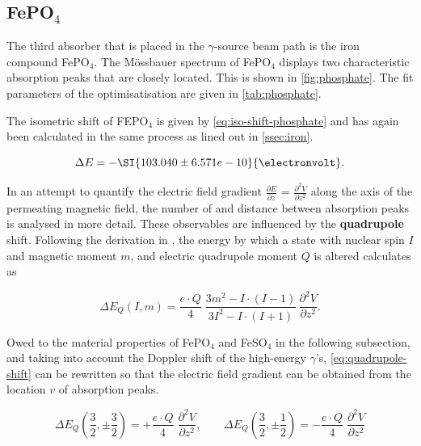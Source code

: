 
\subsection{FePO$_4$}
\label{ssec:phosphate}

The third absorber that is placed in the $\gamma$-source beam path is the iron
compound FePO$_4$. The Mössbauer spectrum of FePO$_4$ displays two characteristic
absorption peaks that are closely located. This is shown in \autoref{fig:phosphate}.
The fit parameters of the optimisatisation are given in \autoref{tab:phosphate}.

The isometric shift of FEPO$_4$ is given by \autoref{eq:iso-shift-phosphate} and has
again been calculated in the same process as lined out in \autoref{ssec:iron}.

\begin{equation}
\label{eq:iso-shift-phosphate}
\Delta E = -\SI{103.040\pm6.571e-10}{\electronvolt}.
\end{equation}

In an attempt to quantify the electric field gradient $\frac{\partial E}{\partial z}$
= $\frac{\partial^2 V}{\partial z^2}$ along the axis of the permeating magnetic
field, the number of and distance between absorption peaks is analysed in more
detail. These observables are influenced by the \textbf{quadrupole} shift. Following
the derivation in \cite{Sch17}, the energy by which a state with nuclear spin $I$ and
magnetic moment $m$, and electric quadrupole moment $Q$ is altered calculates as

\begin{equation}
\label{eq:quadrupole-shift}
\Delta E_Q(I,m) = \frac{e\cdot Q}{4}\;\frac{3m^2-I\cdot(I-1)}{3I^2-I\cdot(I+1)}\,\frac{\partial^2V}{\partial z^2}.
\end{equation}

Owed to the material properties of FePO$_4$ and FeSO$_4$ in the following subsection,
and taking into account the Doppler shift of the high-energy $\gamma$'s,
\autoref{eq:quadrupole-shift} can be rewritten so that the electric field gradient
can be obtained from the location $v$ of absorption peaks.

\begin{equation*}
	\Delta E_Q(\frac{3}{2},\pm\frac{3}{2}) = +\frac{e\cdot Q}{4}\;\frac{\partial^2 V}{\partial z^2},\qquad \Delta E_Q(\frac{3}{2},\pm\frac{1}{2}) = -\frac{e\cdot Q}{4}\;\frac{\partial^2 V}{\partial z^2}
\end{equation*}

